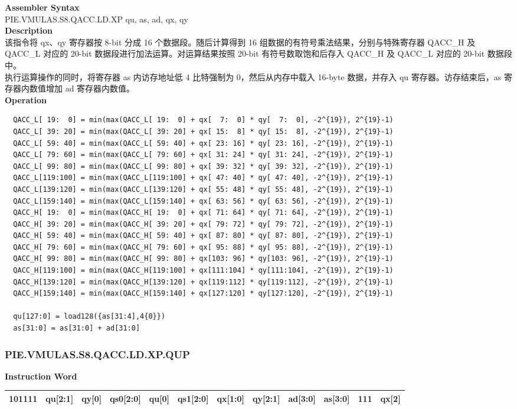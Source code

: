 \textbf{Assembler Syntax} \\
PIE.VMULAS.S8.QACC.LD.XP qu, as, ad, qx, qy \\
\textbf{Description} \\
该指令将 qx、qy 寄存器按 8-bit 分成 16 个数据段。随后计算得到 16 组数据的有符号乘法结果，分别与特殊寄存器 QACC\_H 及 QACC\_L 对应的 20-bit 数据段进行加法运算。对运算结果按照 20-bit 有符号数取饱和后存入 QACC\_H 及 QACC\_L 对应的 20-bit 数据段中。\\
执行运算操作的同时，将寄存器 as 内访存地址低 4 比特强制为 0，然后从内存中载入 16-byte 数据，并存入 qu 寄存器。访存结束后，as 寄存器内数值增加 ad 寄存器内数值。\\
\textbf{Operation}
\begin{lstlisting}
  QACC_L[ 19:  0] = min(max(QACC_L[ 19:  0] + qx[  7:  0] * qy[  7:  0], -2^{19}), 2^{19}-1)
  QACC_L[ 39: 20] = min(max(QACC_L[ 39: 20] + qx[ 15:  8] * qy[ 15:  8], -2^{19}), 2^{19}-1)
  QACC_L[ 59: 40] = min(max(QACC_L[ 59: 40] + qx[ 23: 16] * qy[ 23: 16], -2^{19}), 2^{19}-1)
  QACC_L[ 79: 60] = min(max(QACC_L[ 79: 60] + qx[ 31: 24] * qy[ 31: 24], -2^{19}), 2^{19}-1)
  QACC_L[ 99: 80] = min(max(QACC_L[ 99: 80] + qx[ 39: 32] * qy[ 39: 32], -2^{19}), 2^{19}-1)
  QACC_L[119:100] = min(max(QACC_L[119:100] + qx[ 47: 40] * qy[ 47: 40], -2^{19}), 2^{19}-1)
  QACC_L[139:120] = min(max(QACC_L[139:120] + qx[ 55: 48] * qy[ 55: 48], -2^{19}), 2^{19}-1)
  QACC_L[159:140] = min(max(QACC_L[159:140] + qx[ 63: 56] * qy[ 63: 56], -2^{19}), 2^{19}-1)
  QACC_H[ 19:  0] = min(max(QACC_H[ 19:  0] + qx[ 71: 64] * qy[ 71: 64], -2^{19}), 2^{19}-1)
  QACC_H[ 39: 20] = min(max(QACC_H[ 39: 20] + qx[ 79: 72] * qy[ 79: 72], -2^{19}), 2^{19}-1)
  QACC_H[ 59: 40] = min(max(QACC_H[ 59: 40] + qx[ 87: 80] * qy[ 87: 80], -2^{19}), 2^{19}-1)
  QACC_H[ 79: 60] = min(max(QACC_H[ 79: 60] + qx[ 95: 88] * qy[ 95: 88], -2^{19}), 2^{19}-1)
  QACC_H[ 99: 80] = min(max(QACC_H[ 99: 80] + qx[103: 96] * qy[103: 96], -2^{19}), 2^{19}-1)
  QACC_H[119:100] = min(max(QACC_H[119:100] + qx[111:104] * qy[111:104], -2^{19}), 2^{19}-1)
  QACC_H[139:120] = min(max(QACC_H[139:120] + qx[119:112] * qy[119:112], -2^{19}), 2^{19}-1)
  QACC_H[159:140] = min(max(QACC_H[159:140] + qx[127:120] * qy[127:120], -2^{19}), 2^{19}-1)

  qu[127:0] = load128({as[31:4],4{0}})
  as[31:0] = as[31:0] + ad[31:0]
\end{lstlisting}

\newpage
\subsubsection{PIE.VMULAS.S8.QACC.LD.XP.QUP}\label{instruction:PIEVMULASS8QACCLDXPQUP}
\setlength\tabcolsep{6pt}
\textbf{Instruction Word} \\
\begin{tabular}{|c|c|c|c|c|c|c|c|c|c|c|c|}
	\hline
	101111 & qu[2:1] & qy[0] & qs0[2:0] & qu[0] & qs1[2:0] & qx[1:0] & qy[2:1] & ad[3:0] & as[3:0] & 111 & qx[2] \\
	\hline
\end{tabular}

